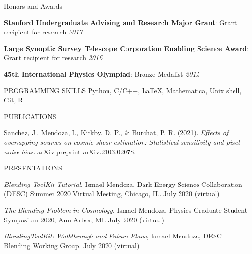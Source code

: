 \documentclass{resume} %
\begin{document}
\begin{rSection}{Honors and Awards} \itemsep -3pt \vspace*{-.25cm}
\item \textbf{Stanford Undergraduate Advising and Research Major Grant}: Grant recipient for research \hfill {\em 2017}

\item \textbf{Large Synoptic Survey Telescope Corporation Enabling Science Award}: Grant recipient for research \hfill {\em 2016}

\item \textbf{45th International Physics Olympiad}:  Bronze Medalist \hfill {\em 2014}
\end{rSection}
\begin{rSection}{PROGRAMMING SKILLS}
%
Python, C/C++, \LaTeX, Mathematica, Unix shell, Git, R
\end{rSection}


\begin{rSection}{PUBLICATIONS}
%
\vspace*{-1em}
\item Sanchez, J., Mendoza, I., Kirkby, D. P., \& Burchat, P. R. (2021). \textit{Effects of overlapping sources on cosmic shear estimation: Statistical sensitivity and pixel-noise bias.} arXiv preprint arXiv:2103.02078.
\end{rSection}


\begin{rSection}{PRESENTATIONS}
%
\vspace*{-1em}
\item  \textit{Blending ToolKit Tutorial}, Ismael Mendoza, Dark Energy Science Collaboration (DESC) Summer 2020 Virtual Meeting, Chicago, IL. July 2020 (virtual)
%
\item \textit{The Blending Problem in Cosmology}, Ismael Mendoza, Physics Graduate Student Symposium 2020, Ann Arbor, MI. July 2020 (virtual)
%
\item \textit{BlendingToolKit: Walkthrough and Future Plans}, Ismael Mendoza, DESC Blending Working Group. July 2020 (virtual)
\end{rSection}



\end{document}
